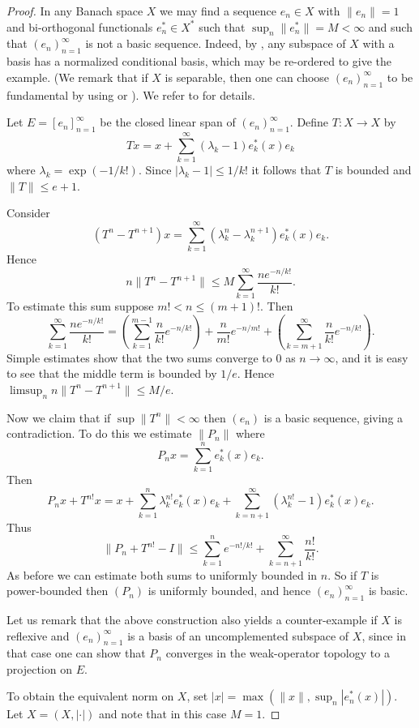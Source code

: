 \documentclass[12pt]{amsart}
\begin{document}
\begin{proof}
In any Banach space $X$ we may find a sequence $e_n\in X$ with
$\|e_n\|=1$ and bi-orthogonal functionals $e_n^*\in X^*$ such that
$\sup_n\|e_n^*\|=M<\infty$ and such that $(e_n)_{n=1}^{\infty}$ is
not a basic sequence.  Indeed, by \cite{PS}, any subspace of $X$
with a basis has a normalized conditional basis, which may be
re-ordered to give the example.  (We remark that if $X$ is
separable, then one can choose $(e_n)_{n=1}^{\infty}$ to be
fundamental by using \cite{OP} or \cite{P}).  We refer to
\cite{LT} for details.

Let $E=[e_n]_{n=1}^{\infty}$ be the closed linear span of
$(e_n)_{n=1}^{\infty}$.  Define $T:X\to X$ by
$$Tx = x+\sum_{k=1}^{\infty}(\lambda_k-1)e_k^*(x)e_k$$
where $\lambda_k=\exp(-1/k!)$.  Since $|\lambda_k-1|\le 1/k!$ it
follows that $T$ is bounded and $\|T\|\le e+1$.

Consider
$$(T^n-T^{n+1})x=
\sum_{k=1}^{\infty}(\lambda_k^n-\lambda_k^{n+1})e_k^*(x)e_k.$$
Hence
$$ n\|T^n-T^{n+1}\|\le M\sum_{k=1}^{\infty}\frac{ ne^{-n/k!}}{k!}.$$
To estimate this sum suppose $m!<n\le (m+1)!$.  Then
$$\sum_{k=1}^{\infty}\frac{ ne^{-n/k!}}{k!}=
\left(\sum_{k=1}^{m-1} \frac{n}{k!}e^{-n/k!}\right) +
\frac{n}{m!}e^{-n/m!} +
\left(\sum_{k=m+1}^{\infty}\frac{n}{k!}e^{-n/k!}\right).$$ Simple estimates
show that the two sums converge to $0$ as $n \to \infty$, and it
is easy to see that the middle term is bounded by $1/e$. Hence
$\limsup_n n\|T^n-T^{n+1}\| \le M/e$.

Now we claim that if $\sup\|T^n\|<\infty$ then $(e_n)$ is a basic
sequence, giving a contradiction. To do this we estimate $\|P_n\|$
where
$$ P_nx=\sum_{k=1}^n e_k^*(x)e_k.$$
Then
$$ P_nx+T^{n!}x= x + \sum_{k=1}^n \lambda_k^{n!}e_k^*(x)e_k
+\sum_{k=n+1}^{\infty}(\lambda_k^{n!}-1)e_k^*(x)e_k.$$ Thus
$$ \|P_n+T^{n!}-I\| \le \sum_{k=1}^n e^{-n!/k!} +
\sum_{k=n+1}^{\infty} \frac{n!}{k!}.$$ As before we can estimate
both sums to uniformly bounded in $n$. So if $T$ is power-bounded
then $(P_n)$ is uniformly bounded, and hence
$(e_n)_{n=1}^{\infty}$ is basic.

Let us remark that the above construction also yields a
counter-example if $X$ is reflexive and $(e_n)_{n=1}^{\infty}$ is
a basis of an uncomplemented subspace of $X$, since in that case
one can show that $P_n$ converges in the weak-operator topology to
a projection on $E$.

To obtain the equivalent norm on
$X$, set $|x|=\max(\|x\|,\sup_n|e_n^*(x)|)$.  Let $X=(X,|\cdot|)$
and note that in this case $M=1$.
\end{proof}
\end{document}
